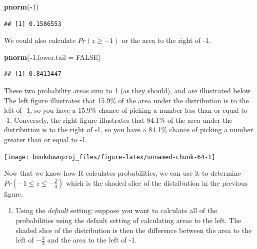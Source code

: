 \documentclass[
]{book}
\newenvironment{Shaded}{\begin{snugshade}}{\end{snugshade}}
\newcommand{\AttributeTok}[1]{\textcolor[rgb]{0.13,0.29,0.53}{#1}}
\newcommand{\ConstantTok}[1]{\textcolor[rgb]{0.56,0.35,0.01}{#1}}
\newcommand{\DecValTok}[1]{\textcolor[rgb]{0.00,0.00,0.81}{#1}}
\newcommand{\FunctionTok}[1]{\textcolor[rgb]{0.13,0.29,0.53}{\textbf{#1}}}
\newcommand{\NormalTok}[1]{#1}
\newcommand{\SpecialCharTok}[1]{\textcolor[rgb]{0.81,0.36,0.00}{\textbf{#1}}}
\providecommand{\tightlist}{%
  \setlength{\itemsep}{0pt}\setlength{\parskip}{0pt}}
\begin{document}
\begin{Shaded}
\begin{Highlighting}[]
\FunctionTok{pnorm}\NormalTok{(}\SpecialCharTok{{-}}\DecValTok{1}\NormalTok{)}
\end{Highlighting}
\end{Shaded}

\begin{verbatim}
## [1] 0.1586553
\end{verbatim}

We could also calculate \(Pr(z\geq-1)\) or the area to the right of -1.

\begin{Shaded}
\begin{Highlighting}[]
\FunctionTok{pnorm}\NormalTok{(}\SpecialCharTok{{-}}\DecValTok{1}\NormalTok{,}\AttributeTok{lower.tail =} \ConstantTok{FALSE}\NormalTok{)}
\end{Highlighting}
\end{Shaded}

\begin{verbatim}
## [1] 0.8413447
\end{verbatim}

These two probability areas sum to 1 (as they should), and are illustrated below. The left figure illustrates that 15.9\% of the area under the distribution is to the left of -1, so you have a 15.9\% chance of picking a number less than or equal to -1. Conversely, the right figure illustrates that 84.1\% of the area under the distribution is to the right of -1, so you have a 84.1\% chance of picking a number greater than or equal to -1.

\begin{center}\texttt{[image: bookdownproj\_files/figure-latex/unnamed-chunk-64-1]} \end{center}

Now that we know how R calculates probabilities, we can use it to determine \(Pr(-1 \leq z \leq -\frac{2}{3})\) which is the shaded slice of the distribution in the previous figure.

\begin{enumerate}
\def\labelenumi{\arabic{enumi}.}
\tightlist
\item
  Using the \emph{default} setting: suppose you want to calculate all of the probabilities using the default setting of calculating areas to the left. The shaded slice of the distribution is then the difference between the area to the left of \(-\frac{2}{3}\) and the area to the left of -1.
\end{enumerate}
\end{document}
